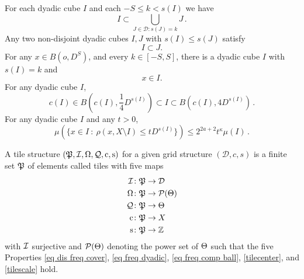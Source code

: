 For each dyadic cube $I$  and each $-S\le k<s(I)$ we have
\begin{equation}\label{coverdyadic}
I\subset \bigcup_{J\in \mathcal {D}: s(J)=k}J\, .
\end{equation}
Any two non-disjoint dyadic cubes  $I,J$ with $s(I)\le s(J)$ satisfy
\begin{equation}\label{dyadicproperty}
I\subset J.
\end{equation}
For any $x\in B(o,D^S)$, and every $k\in[-S,S]$, there
is a dyadic cube $I$ with $s(I)=k$ and
\begin{equation}\label{coverball}
x\in I.
\end{equation}
For any dyadic cube $I$,
    \begin{equation}
        \label{eq vol sp cube}
        c(I)\in B(c(I), \frac{1}{4} D^{s(I)}) \subset I \subset B(c(I), 4 D^{s(I)})\,.
    \end{equation}
For any dyadic cube  $I$ and any $t>0$,
\begin{equation}
        \label{eq small boundary}
        \mu(\{x \in I \ : \ \rho(x, X \setminus I) \leq t D^{s(I)}\}) \le 2^{2a+2} t^\kappa \mu(I)\,.
    \end{equation}








A tile structure  $(\fP,\sc,\fc,\fcc,\pc,\ps)$
for a given grid structure $(\mathcal{D}, c, s)$
is a finite set $\fP$  of elements called tiles with five maps
\begin{align*}
\sc&\colon \fP\to {\mathcal{D}}\\
\fc&\colon \fP\to \mathcal{P}(\Mf) \\
\fcc &\colon \fP\to \Mf\\
\pc &\colon \fP\to X\\
\ps &\colon \fP\to \mathbb{Z}
\end{align*}
with $\sc$ surjective and $\mathcal{P}(\Mf)$ denoting the power set of $\Mf$ such that the five Properties \eqref{eq dis freq cover}, \eqref{eq freq dyadic},
\eqref{eq freq comp ball}, \eqref{tilecenter}, and
\eqref{tilescale} hold.

